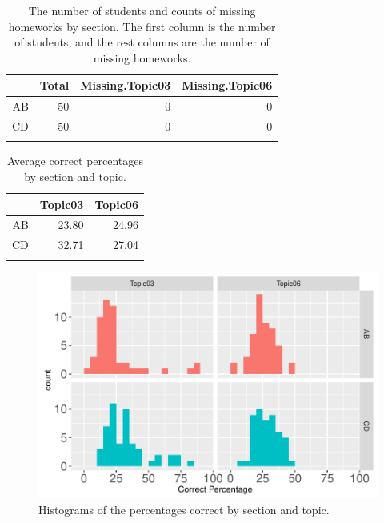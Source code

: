 \documentclass[12pt,nohyper]{tufte-handout}\usepackage[]{graphicx}\usepackage[]{color}
\begin{document}
\begin{longtable}{rrrr}
  \hline
 & Total & Missing.Topic03 & Missing.Topic06 \\ 
  \hline
AB &  50 &   0 &   0 \\ 
  CD &  50 &   0 &   0 \\ 
   \hline
\hline
\caption{The number of students and counts of missing 
                      homeworks by section. The first column is the number 
                      of students, and the rest columns are the number of 
                      missing homeworks.} 
\label{tab:count}
\end{longtable}
\begin{longtable}{rrr}
  \hline
 & Topic03 & Topic06 \\ 
  \hline
AB & 23.80 & 24.96 \\ 
  CD & 32.71 & 27.04 \\ 
   \hline
\hline
\caption{Average correct percentages by section and topic.} 
\label{tab:mean}
\end{longtable}
\begin{center}
\begin{figure}
\begin{centering}
\includegraphics[width=0.95\linewidth]{Stat101_allSections_histbystu}
\par\end{centering}
\caption{\label{fig:hist}Histograms of the percentages correct by section and topic.}
\end{figure}\par\end{center}
\end{document}
